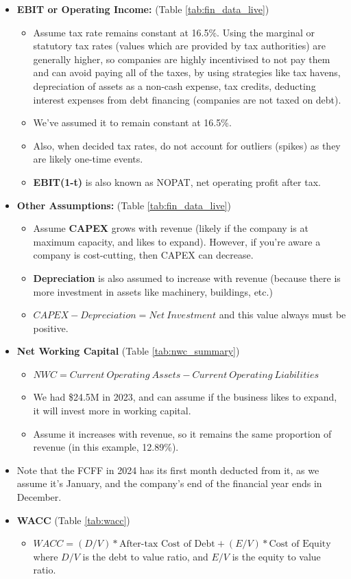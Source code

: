 \begin{itemize}
\begin{itemize}
        \end{itemize}
    \item \textbf{EBIT or Operating Income: } (Table \ref{tab:fin_data_live})
    \begin{itemize}
        \item Assume tax rate remains constant at 16.5\%. Using the marginal or statutory tax rates (values which are provided by tax authorities) are generally higher, so companies are highly incentivised to not pay them and can avoid paying all of the taxes, by using strategies like tax havens, depreciation of assets as a non-cash expense, tax credits, deducting interest expenses from debt financing (companies are not taxed on debt).
        \item We've assumed it to remain constant at 16.5\%. 
        \item Also, when decided tax rates, do not account for outliers (spikes) as they are likely one-time events.
        \item \textbf{EBIT(1-t)} is also known as NOPAT, net operating profit after tax.  
    \end{itemize}
    \item \textbf{Other Assumptions: } (Table \ref{tab:fin_data_live})    
    \begin{itemize}
            \item Assume \textbf{CAPEX} grows with revenue (likely if the company is at maximum capacity, and likes to expand). However, if you're aware a company is cost-cutting, then CAPEX can decrease.
            \item \textbf{Depreciation} is also assumed to increase with revenue (because there is more investment in assets like machinery, buildings, etc.)
            \item $CAPEX - Depreciation = Net \ Investment$ and this value always must be positive.
        \end{itemize}
    \item \textbf{Net Working Capital} (Table \ref{tab:nwc_summary})    
    \begin{itemize}
        \item $NWC = Current \ Operating \ Assets - Current \ Operating \ Liabilities $
        \item We had \$24.5M in 2023, and can assume if the business likes to expand, it will invest more in working capital.
        \item Assume it increases with revenue, so it remains the same proportion of revenue (in this example, 12.89\%).
    \end{itemize}
    \item Note that the FCFF in 2024 has its first month deducted from it, as we assume it's January, and the company's end of the financial year ends in December.
    \item \textbf{WACC} (Table \ref{tab:wacc})
    \begin{itemize}
        \item $WACC = (D/V)*\text{After-tax Cost of Debt} + (E/V)*\text{Cost of Equity}$ where $D/V$ is the debt to value ratio, and $E/V$ is the equity to value ratio.
    \end{itemize}
\end{itemize}
